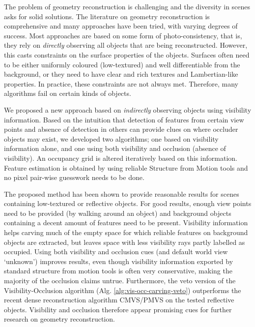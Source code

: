 
The problem of geometry reconstruction is challenging and the diversity in scenes asks for solid solutions. The literature on geometry reconstruction is comprehensive and many approaches have been tried, with varying degrees of success. Most approaches are based on some form of photo-consistency, that is, they rely on \emph{directly} observing all objects that are being reconstructed. However, this casts constraints on the surface properties of the objects. Surfaces often need to be either uniformly coloured (low-textured) and well differentiable from the background, or they need to have clear and rich textures and Lambertian-like properties. In practice, these constraints are not always met. Therefore, many algorithms fail on certain kinds of objects.

We proposed a new approach based on \emph{indirectly} observing objects using visibility information. Based on the intuition that detection of features from certain view points and absence of detection in others can provide clues on where occluder objects may exist, we developed two algorithms; one based on visibility information alone, and one using both visibility and occlusion (\ie absence of visibility). An occupancy grid is altered iteratively based on this information. Feature estimation is obtained by using reliable Structure from Motion tools and no pixel pair-wise guesswork needs to be done.

The proposed method has been shown to provide reasonable results for scenes containing low-textured or reflective objects. For good results, enough view points need to be provided (\eg by walking around an object) and background objects containing a decent amount of features need to be present. Visibility information helps carving much of the empty space for which reliable features on background objects are extracted, but leaves space with less visibility rays partly labelled as occupied. Using both visibility and occlusion cues (and default world view `unknown') improves results, even though visibility information exported by standard structure from motion tools is often very conservative, making the majority of the occlusion claims untrue. Furthermore, the veto version of the Visibility-Occlusion algorithm (Alg. \ref{alg:vis-occ-carving-veto}) outperforms the recent dense reconstruction algorithm CMVS/PMVS on the tested reflective objects. Visibility and occlusion therefore appear promising cues for further research on geometry reconstruction. 

